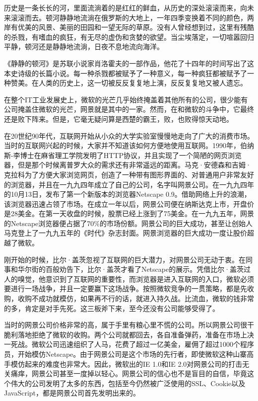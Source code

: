 \documentclass[
  letterpaper,
  DIV=11,
  numbers=noendperiod]{scrreprt}
\begin{document}
历史是一条长长的河，里面流淌着的是红红的鲜血，从历史的深处滚滚而来，向未来滚滚而去。顿河静静地流淌在俄罗斯的大地上，一年四季变换着不同的颜色，两岸有优美的风景、美丽的田园和一望无际的草原。没有人曾经想到过，这里有残酷的杀戮，有嗜血的疯狂，有无尽的虚伪和贪婪的欲望。当尘埃落定，一切喧嚣回归平静，顿河还是静静地流淌，日夜不息地流向海洋。

《静静的顿河》是苏联小说家肖洛霍夫的一部作品，他花了十四年的时间写出了这本史诗级的长篇小说。每一种杀戮都被赋予了一种意义，每一种疯狂都被赋予了一种赞美。在人类的历史上，这一切被反反复复地上演，反反复复地又被人遗忘。

在整个IT工业发展史上，微软的光芒几乎始终掩盖着其他所有的公司，很少能有公司掩盖住微软的光芒，网景就是其中的一家。然而，在和微软的斗争中，它最终还是败下阵来。但是，它毫无疑问算是西楚的霸王，败，也败得惊天动地。

在20世纪90年代，互联网开始从小众的大学实验室慢慢地走向了广大的消费市场。当时的互联网兴起的时候，大家并不知道该如何方便地使用互联网。1990年，伯纳斯-李博士在麻省理工学院发明了HTTP协议，并且实现了一个简陋的网页浏览器，但是那个时候离普罗大众的需求还有非常遥远的距离。马克·安德森和吉姆·克拉科为了方便大家浏览网页，创造了一种带有图形界面的、对普通用户非常友好的浏览器，并且在一九九四年成立了自己的公司，名字叫网景公司。在一九九四年的10月13日，发布了第一个新版本的浏览器Netscape
0.9。借助网络上升的浪潮，该浏览器迅速占领了市场。在成立一年以后，网景公司便在纳斯达克上市，开盘价是28美金。在第一天收盘的时候，股票已经上涨到了75美金。在一九九五年，网景的Netscape浏览器便占据了70\%的市场份额。网景公司的巨大成功，甚至让创始人马克登上了一九九五年的《时代》杂志封面。网景浏览器的巨大成功一度让股价超越了微软。

刚开始的时候，比尔·盖茨忽视了互联网的巨大潜力，对网景公司无动于衷。在同事和华尔街的百般劝告下，比尔·盖茨才看了Netscape的展示。凭借比尔·盖茨过人的嗅觉，他意识到了互联网的重要性，而浏览器是进入互联网的入口，微软必须要进行一场战争，并且一定要赢下这场战争。按照微软竞争的一贯策略，都是先收购，收购不成功就模仿，如果再不行的话，就进入持久战。比流血，微软的钱非常的多，肯定是对手先死。这三板斧下来，至今还没有公司能够受得了。

当时的网景公司价格非常的高，属于手里有粮心里不慌的公司。所以网景公司很干脆利落地拒绝了微软的收购。两个公司就都回去，各自准备弹药，准备在市场上决一死战。微软公司迅速组织了人马，花费了超过一亿美金，雇佣了超过1000个程序员，开始模仿Netscape。由于网景公司是这个市场的先行者，即使微软这种山寨高手模仿起来的难度也非常大。因此，微软出的IE
1.0和IE
2.0对网景公司的打击无关痛痒，网景公司甚至一度掉以轻心。网景公司的信心也不是盲目的自信，毕竟这个伟大的公司发明了太多的东西，包括至今仍然被广泛使用的SSL、Cookie以及JavaScript，都是网景公司首先发明出来的。
\end{document}
